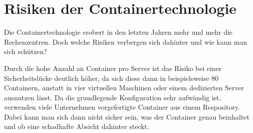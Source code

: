 \section{Risiken der Containertechnologie}
\label{sec:Risiken der Containertechnologie}
Die Containertechnologie erobert in den letzten Jahren mehr und mehr die Rechenzentren. Doch welche Risiken verbergen sich dahinter und wie kann man sich schützen?

Durch die hohe Anzahl an Container pro Server ist das Risiko bei einer Sicherheitslücke deutlich höher, da sich diese dann in beispielsweise 80 Containern, anstatt in vier virtuellen Maschinen oder einem dedizierten Server ausnutzen lässt. Da die grundlegende Konfiguration sehr aufwändig ist, verwenden viele Unternehmen vorgefertigte Container aus einem Respository. Dabei kann man sich dann nicht sicher sein, was der Container genau beinhaltet und ob eine schadhafte Absicht dahinter steckt.\cite{Risiken}  
